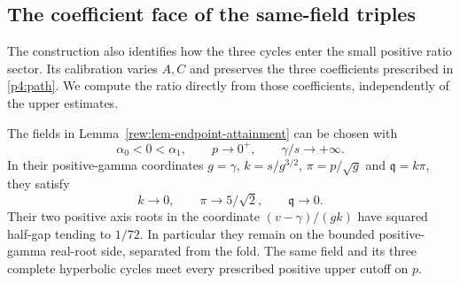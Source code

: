 \subsection{The coefficient face of the same-field triples}

The construction also identifies how the three cycles enter the small
positive ratio sector. Its calibration varies $A,C$ and preserves the
three coefficients prescribed in \eqref{p4:path}. We compute the ratio
directly from those coefficients, independently of the upper estimates.

\begin{proposition}\label{prop:lower-coefficient-face}
The fields in Lemma~\ref{rew:lem-endpoint-attainment} can be chosen with
\[
 \alpha_0<0<\alpha_1,\qquad p\longrightarrow0^+,
 \qquad \gamma/s\longrightarrow+\infty.
\]
In their positive-gamma coordinates
$g=\gamma$, $k=s/g^{3/2}$, $\pi=p/\sqrt g$ and
$\mathfrak q=k\pi$, they satisfy
\[
 k\longrightarrow0,\qquad \pi\longrightarrow5/\sqrt2,
 \qquad \mathfrak q\longrightarrow0.
\]
Their two positive axis roots in the coordinate
$(v-\gamma)/(gk)$ have squared half-gap tending to $1/72$.
In particular they remain on the bounded positive-gamma real-root
side, separated from the fold. The same field and its three complete
hyperbolic cycles meet every prescribed positive upper cutoff on $p$.
\end{proposition}

